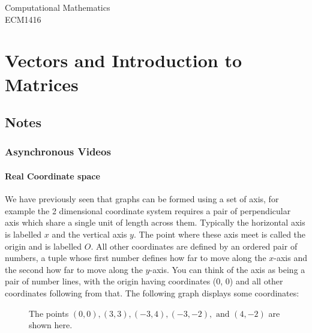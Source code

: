 \documentclass[a4paper,oneside]{report}
\begin{document}
\begin{titlepage}
	\raggedleft
	\vspace*{1cm}
	\Huge{Computational Mathematics}\\
	\vspace{0.5cm}
	\Large{ECM1416}
\end{titlepage}

\null
\thispagestyle{empty}
\addtocounter{page}{-2}
\newpage

\tableofcontents

\chapter{Vectors and Introduction to Matrices}

\section{Notes}

\subsection{Asynchronous Videos}

\subsubsection{Real Coordinate space}

We have previously seen that graphs can be formed using a set of axis, for
example the 2 dimensional coordinate system requires a pair of perpendicular
axis which share a single unit of length across them. Typically the horizontal
axis is labelled \( x \) and the vertical axis \( y \). The point where these
axis meet is called the origin and is labelled \( O \). All other coordinates
are defined by an ordered pair of numbers, a tuple whose first number defines
how far to move along the \( x \)-axis and the second how far to move along
the \( y \)-axis. You can think of the axis as being a pair of number lines,
with the origin having coordinates (0, 0) and all other coordinates following
from that. The following graph displays some coordinates:

\begin{figure}[h]
	\centering

	The points \((0, 0), (3, 3), (-3, 4), (-3, -2), \text{ and }
	(4, -2)\) are shown here.
\end{figure}
\end{document}
